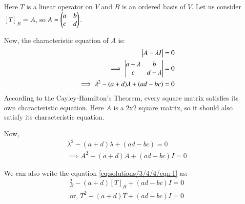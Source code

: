 Here $T$ is a linear operator on $V$ and $B$ is an ordered basis of $V$.
Let us consider $[T]_B = A$, so $A = \begin{pmatrix}a & b\\c & d\end{pmatrix}$.

Now, the characteristic equation of $A$ is:
\begin{align}
\begin{vmatrix}A-\lambda I\end{vmatrix}=0\\
\implies \begin{vmatrix}a-\lambda & b\\c & d-\lambda\end{vmatrix}=0\\
\implies \lambda^2 - (a+d)\lambda + (ad-bc)=0
\end{align}
According to the Cayley-Hamilton's Theorem, every square matrix satisfies its own characteristic equation. Here $A$ is a 2x2 square matrix, so it should also satisfy its characteristic equation.

Now,
\begin{align}
\lambda^2 - (a+d)\lambda + (ad-bc)=0\\
\implies A^2 - (a+d)A + (ad-bc)I=0
\label{eq:solutions/3/4/4/eqn:1}
\end{align}

We can also write the equation \ref{eq:solutions/3/4/4/eqn:1} as:
\begin{align}
[T]_B^2 - (a+d)[T]_B + (ad-bc)I=0\\
\text{or, } T^2 - (a+d)T + (ad-bc)I=0
\end{align}
